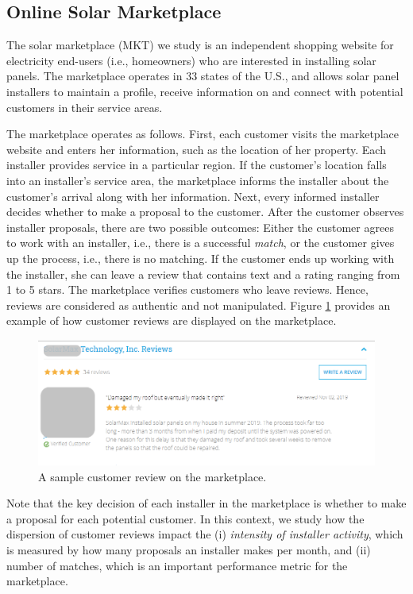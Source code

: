 \documentclass[msom,blindrev]{informs3}
\begin{document}
\subsection{Online Solar Marketplace}

The solar marketplace (MKT) we study is an independent shopping website for electricity end-users (i.e., homeowners) who are interested in installing solar panels.  The marketplace operates in 33 states of the U.S., and allows solar panel installers to maintain a profile, receive information on and connect with potential customers in their service areas.

The marketplace operates as follows. First, each customer visits the marketplace website and enters her information, such as the location of her property. Each installer provides service in a particular region. If the customer's location falls into an installer's service area, the marketplace informs the installer about the customer's arrival along with her information. Next, every informed installer decides whether to make a proposal to the customer. After the customer observes installer proposals, there are two possible outcomes: Either the customer agrees to work with an installer, i.e., there is a successful \emph{match}, or the customer gives up the process, i.e., there is no matching. If the customer ends up working with the installer, she can leave a review that contains text and a rating ranging from 1 to 5 stars. The marketplace verifies customers who leave reviews. Hence, reviews are considered as authentic and not manipulated. Figure \ref{reviews_example} provides an example of how customer reviews are displayed on the marketplace.


\begin{figure}
	\centering
	\includegraphics[width=0.81\linewidth]{reviews_example.png}
	\caption{A sample customer review on the marketplace.}
	\label{reviews_example}
\end{figure}

Note that the key decision of each installer in the marketplace is whether to make a proposal for each potential customer.
 In this context, we study how the dispersion of customer reviews impact the (i) \emph{intensity of installer activity}, which is measured by how many proposals an installer makes per month, and (ii) number of matches, which is an important performance metric for the marketplace.
\end{document}
